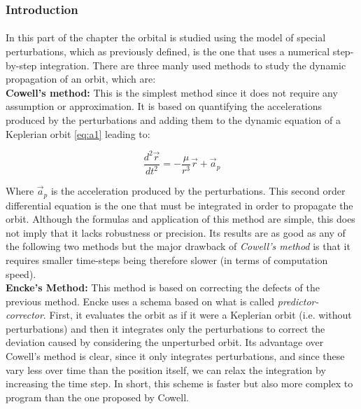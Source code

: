 \subsubsection{Introduction}
\paragraph{}In this part of the chapter the orbital is studied using the model of special perturbations, which as previously defined, is the one that uses a numerical step-by-step integration. There are three manly used methods to study the dynamic propagation of an orbit, which are:\\

\textbf{Cowell's method:} This is the simplest method since it does not require any assumption or approximation. It is based on quantifying the accelerations produced by the perturbations and adding them to the dynamic equation of a Keplerian orbit \ref{eq:a1} leading to:

\begin{equation}\label{eq:ode}
\frac{d^2 \vec{r}}{d t^2}=-\frac{\mu}{r^3}\vec{r}+\vec{a}_p
\end{equation}

Where $\vec{a}_p$ is the acceleration produced by the perturbations. This second order differential equation is the one that must be integrated in order to propagate the orbit. Although the formulas and application of this method are simple, this does not imply that it lacks robustness or precision. Its results are as good as any of the following two methods but the major drawback of \textit{Cowell's method} is that it requires smaller time-steps being therefore slower (in terms of computation speed).\\

\textbf{Encke's Method:} This method is based on correcting the defects of the previous method. Encke uses a schema based on what is called \textit{predictor-corrector}. First, it evaluates the orbit as if it were a Keplerian orbit (i.e. without perturbations) and then it integrates only the perturbations to correct the deviation caused by considering the unperturbed orbit. Its advantage over Cowell's method is clear, since it only integrates perturbations, and since these vary less over time than the position itself, we can relax the integration by increasing the time step. In short, this scheme is faster but also more complex to program than the one proposed by Cowell.\\

